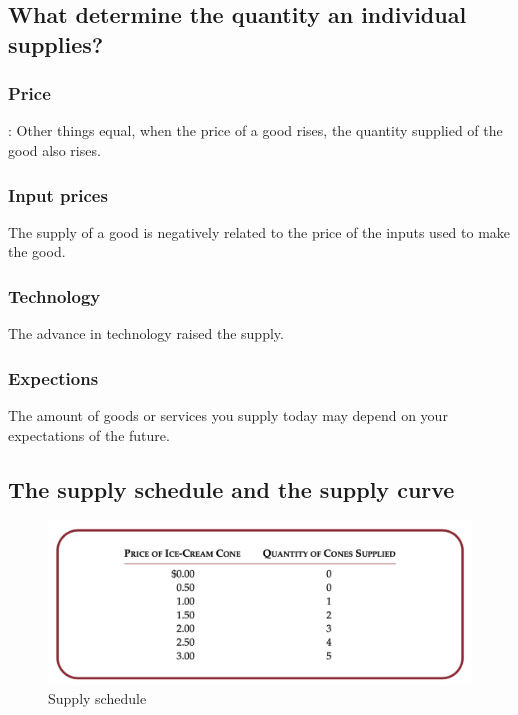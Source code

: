 \subsection{What determine the quantity an individual supplies?}

\subsubsection{Price}

:
Other things equal, when the price of a good rises, the quantity supplied of the good also rises.


\subsubsection{Input prices}

The supply of a good is negatively related to the price of the inputs used to make the good.


\subsubsection{Technology}

The advance in technology raised the supply.


\subsubsection{Expections}

The amount of goods or services you supply today may depend on your expectations of the future.


\subsection{The supply schedule and the supply curve}

\begin{figure}[!ht]
  \centering
  \includegraphics[width=\textwidth]{pics/supply-schedule}
  \caption{Supply schedule}
  \label{fig:supply-schedule}
\end{figure}


